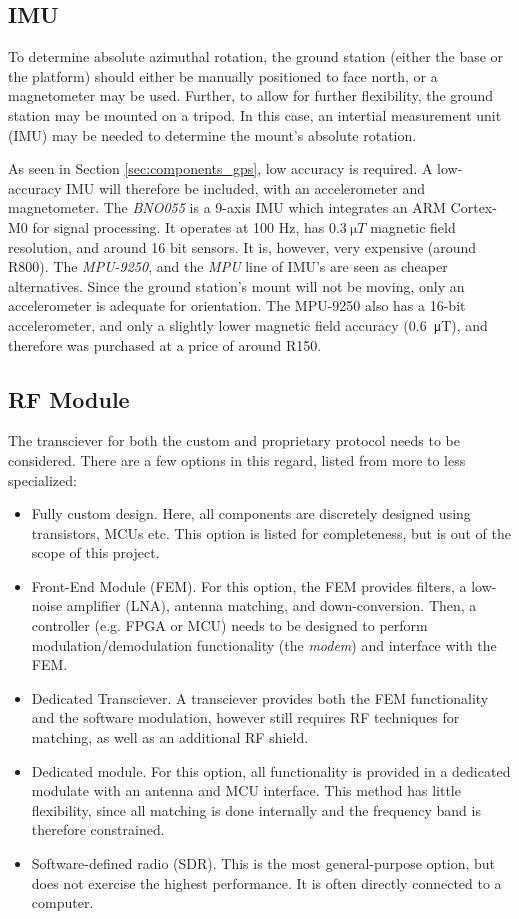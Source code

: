 \subsection{IMU}
To determine absolute azimuthal rotation, the ground station (either the base or the platform) should either be manually positioned to face north, or a magnetometer may be used. Further, to allow for further flexibility, the ground station may be mounted on a tripod. In this case, an intertial measurement unit (IMU) may be needed to determine the mount's absolute rotation.

As seen in Section \ref{sec:components_gps}, low accuracy is required. A low-accuracy IMU will therefore be included, with an accelerometer and magnetometer. The \textit{BNO055} is a 9-axis IMU which integrates an ARM Cortex-M0 for signal processing. It operates at 100 Hz, has $\SI{0.3}{\micro T}$ magnetic field resolution, and around 16 bit sensors. It is, however, very expensive (around R800). The \textit{MPU-9250}, and the \textit{MPU} line of IMU's are seen as cheaper alternatives. Since the ground station's mount will not be moving, only an accelerometer is adequate for orientation. The MPU-9250 also has a 16-bit accelerometer, and only a slightly lower magnetic field accuracy (\SI{0.6}{\micro T}), and therefore was purchased at a price of around R150.

\subsection{RF Module}
The transciever for both the custom and proprietary protocol needs to be considered. There are a few options in this regard, listed from more to less specialized:
\begin{itemize}
    \item Fully custom design. Here, all components are discretely designed using transistors, MCUs etc. This option is listed for completeness, but is out of the scope of this project.
    \item Front-End Module (FEM). For this option, the FEM provides filters, a low-noise amplifier (LNA), antenna matching, and down-conversion. Then, a controller (e.g. FPGA or MCU) needs to be designed to perform modulation/demodulation functionality (the \textit{modem}) and interface with the FEM.
    \item Dedicated Transciever. A transciever provides both the FEM functionality and the software modulation, however still requires RF techniques for matching, as well as an additional RF shield.
    \item Dedicated module. For this option, all functionality is provided in a dedicated modulate with an antenna and MCU interface. This method has little flexibility, since all matching is done internally and the frequency band is therefore constrained.
    \item Software-defined radio (SDR). This is the most general-purpose option, but does not exercise the highest performance. It is often directly connected to a computer.
\end{itemize}

